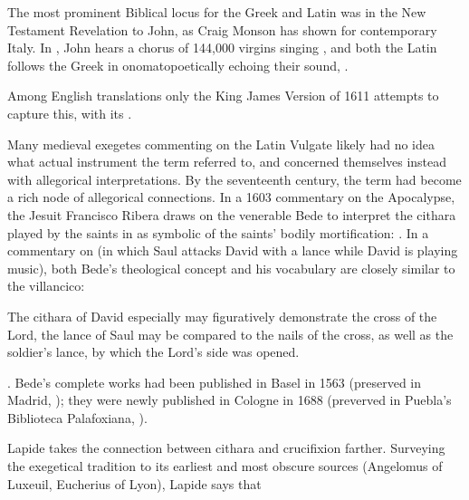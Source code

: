 The most prominent Biblical locus for the Greek  and Latin
 was in the New Testament Revelation to John, as Craig Monson has
shown for contemporary Italy.%
    \autocite[88--95]{Monson:DivasConvent}
In , John hears a chorus of 144,000 virgins singing
, and both the Latin follows the Greek in
onomatopoetically echoing their sound, .%
\begin{Footnote}
    Among English translations only the King James Version of 1611 attempts to
    capture this, with its .
\end{Footnote}
Many medieval exegetes commenting on the Latin Vulgate likely had no idea what
actual instrument the term  referred to, and concerned themselves
instead with allegorical interpretations.
By the seventeenth century, the term had become a rich node of allegorical
connections.
In a 1603 commentary on the Apocalypse, the Jesuit Francisco Ribera draws on
the venerable Bede to interpret the cithara played by the saints in
 as symbolic of the saints' bodily mortification:
.%
    \Autocite[429]{Ribera:Apocalypse}
In a commentary on  (in which Saul attacks David with a
lance while David is playing music), both Bede's theological concept and his
vocabulary are closely similar to the villancico: 
\begin{quoting} 
    The cithara  of David especially may figuratively
    demonstrate the cross of the Lord, the lance  of Saul may
    be compared to the nails  of the cross, as well as the
    soldier's lance, by which the Lord's side was opened.%
\begin{Footnote}
    \Autocite[123]{Bede:Commentaries2}.
    Bede's complete works had been published in Basel in 1563 (preserved in
    Madrid, ); they were newly published in Cologne in 1688
    (preverved in Puebla's Biblioteca Palafoxiana, ).
\end{Footnote}
\end{quoting}
Lapide takes the connection between cithara and crucifixion farther.  
Surveying the exegetical tradition to its earliest and most obscure sources
(Angelomus of Luxeuil, Eucherius of Lyon), Lapide says that
